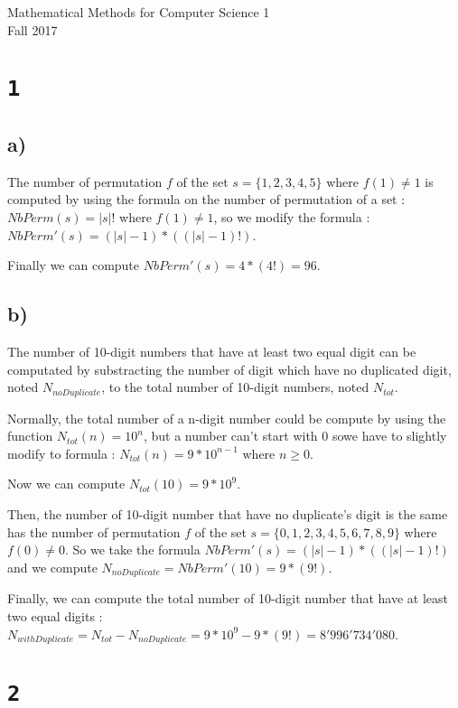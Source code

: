 \documentclass[a4paper,11pt]{report}
\author{Sylvain Julmy}
\date{\today}
\begin{document}
\begin{center}
  \Large{
    Mathematical Methods for Computer Science 1\\
    Fall 2017
  }
  \noindent\makebox[\linewidth]{\rule{\linewidth}{0.4pt}}
  \noindent\makebox[\linewidth]{\rule{\linewidth}{0.4pt}}
\end{center}

\section*{\texttt{1}}
\subsection*{a)}

The number of permutation $f$ of the set $s = \{1,2,3,4,5\}$ where $f(1) \neq 1$
is computed by using the formula on the number of permutation of a set :
$NbPerm(s) = |s|!$ where $f(1) \neq 1$, so we modify the formula :
$NbPerm'(s) = (|s|-1) * ((|s|-1)!)$.

Finally we can compute $NbPerm'(s) = 4 * (4!) = 96.$

\subsection*{b)}

The number of 10-digit numbers that have at least two equal digit can be
computated by substracting the number of digit which have no duplicated digit,
noted $N_{noDuplicate}$, to the total number of 10-digit numbers, noted
$N_{tot}$.

Normally, the total number of a n-digit number could be compute by using the
function $N_{tot}(n) = 10^n$, but a number can't start with $0$ sowe have to
slightly modify to formula : $N_{tot}(n) = 9 *
10^{n-1}$ where $n \ge 0$.

Now we can compute $N_{tot}(10) = 9 * 10^9$.

Then, the number of 10-digit number that have no duplicate's digit is the same
has the number of permutation $f$ of the set $s = \{0,1,2,3,4,5,6,7,8,9\}$ where
$f(0) \neq 0$. So we take the formula $NbPerm'(s) = (|s|-1) * ((|s|-1)!)$ and
we compute $N_{noDuplicate} = NbPerm'(10) = 9 * (9!)$.

Finally, we can compute the total number of 10-digit number that have at least
two equal digits : $N_{withDuplicate} = N_{tot} - N_{noDuplicate} = 9 * 10^9 - 9
* (9!) = 8'996'734'080$.

\section*{\texttt{2}}
\end{document}
